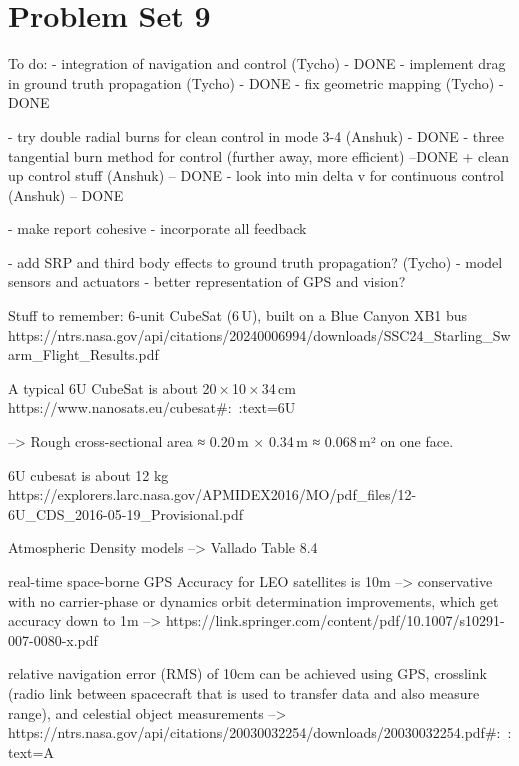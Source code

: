 \section{Problem Set 9}

To do:
- integration of navigation and control (Tycho) - DONE
- implement drag in ground truth propagation (Tycho) - DONE
- fix geometric mapping (Tycho) - DONE

- try double radial burns for clean control in mode 3-4 (Anshuk) - DONE
- three tangential burn method for control (further away, more efficient) --DONE 
+ clean up control stuff (Anshuk) -- DONE
- look into min delta v for continuous control (Anshuk) -- DONE

- make report cohesive 
- incorporate all feedback

- add SRP and third body effects to ground truth propagation? (Tycho)
- model sensors and actuators
    - better representation of GPS and vision?


Stuff to remember: 
6‑unit CubeSat (6 U), built on a Blue Canyon XB1 bus 
https://ntrs.nasa.gov/api/citations/20240006994/downloads/SSC24_Starling_Swarm_Flight_Results.pdf


A typical 6U CubeSat is about 20 × 10 × 34 cm
https://www.nanosats.eu/cubesat#:~:text=6U%


--> Rough cross-sectional area ≈ 0.20 m × 0.34 m ≈ 0.068 m² on one face.

6U cubesat is about 12 kg
https://explorers.larc.nasa.gov/APMIDEX2016/MO/pdf_files/12-6U_CDS_2016-05-19_Provisional.pdf


Atmospheric Density models --> Vallado Table 8.4

real-time space-borne GPS Accuracy for LEO satellites is 10m --> conservative with no carrier-phase or dynamics orbit determination improvements, which get accuracy down to 1m --> https://link.springer.com/content/pdf/10.1007/s10291-007-0080-x.pdf

relative navigation error (RMS) of 10cm can be achieved using GPS, crosslink (radio link between spacecraft that is used to transfer data and also measure range), and celestial object measurements --> https://ntrs.nasa.gov/api/citations/20030032254/downloads/20030032254.pdf#:~:text=A%


